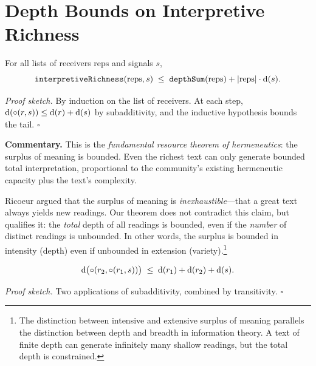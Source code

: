\section{Depth Bounds on Interpretive Richness}
\label{sec:ch20-depth}

\begin{theorem}
\label{thm:universal_depth_bound_ch20}
For all lists of receivers $\text{reps}$ and signals $s$,
\[
  \texttt{interpretiveRichness}(\text{reps}, s) \;\leq\;
  \texttt{depthSum}(\text{reps}) + |\text{reps}| \cdot \operatorname{d}(s).
\]
\end{theorem}

\noindent\textit{Proof sketch.}\quad
By induction on the list of receivers.  At each step, $\operatorname{d}(\circ(r, s))
\leq \operatorname{d}(r) + \operatorname{d}(s)$ by subadditivity, and the inductive hypothesis
bounds the tail.
\hfill$\square$

\medskip

\noindent\textbf{Commentary.}
This is the \emph{fundamental resource theorem of hermeneutics}: the surplus
of meaning is bounded.  Even the richest text can only generate bounded
total interpretation, proportional to the community's existing hermeneutic
capacity plus the text's complexity.

Ricoeur argued that the surplus of meaning is \emph{inexhaustible}---that a
great text always yields new readings.  Our theorem does not contradict this
claim, but qualifies it: the \emph{total} depth of all readings is bounded,
even if the \emph{number} of distinct readings is unbounded.  In other
words, the surplus is bounded in intensity (depth) even if unbounded in
extension (variety).\footnote{The distinction between intensive and
extensive surplus of meaning parallels the distinction between depth and
breadth in information theory.  A text of finite depth can generate
infinitely many shallow readings, but the total depth is constrained.}

\begin{theorem}
\label{thm:double_interp_depth}
\[
  \operatorname{d}\bigl(\circ(r_2, \circ(r_1, s))\bigr) \;\leq\;
  \operatorname{d}(r_1) + \operatorname{d}(r_2) + \operatorname{d}(s).
\]
\end{theorem}

\noindent\textit{Proof sketch.}\quad
Two applications of subadditivity, combined by transitivity.
\hfill$\square$

\medskip

